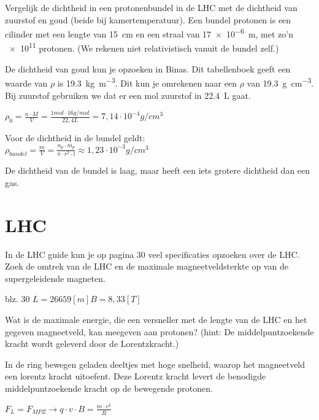 \begin{questions}
\question
Vergelijk de dichtheid in een protonenbundel in de LHC met de dichtheid van zuurstof en goud
(beide bij kamertemperatuur). Een bundel protonen is een cilinder met een lengte
van \SI{15}{\centi\meter} en een straal van \SI{17e-6}{m}, met zo'n \SI{e11}{} protonen.
(We rekenen niet relativistisch vanuit de bundel zelf.)

\begin{solution}

De dichtheid van goud kun je opzoeken in Binas. Dit tabellenboek geeft een waarde van
$\rho$ is \SI{19.3}{\kilogram\per\cubic\meter}. Dit kun je omrekenen naar
een $\rho$ van \SI{19.3}{\gram\per\cubic\centi\meter}.
Bij zuurstof gebruiken we dat er een mol zuurstof in \SI{22.4}{\liter} gaat.

$\rho_0 = \frac{n \cdot M}{V} = \frac {1 mol \cdot 16 g/mol}{22,4 L} = 7,14 \cdot 10^{-4} g/cm^{3} $

Voor de dichtheid in de bundel geldt:\\
$\rho_{bundel} = \frac{m}{V} = \frac{n_{p} \cdot m_{p}}{\pi \cdot r^2 \cdot l} \approx 1,23 \cdot 10^{-3} g/cm^{3}$

De dichtheid van de bundel is laag, maar heeft een iets grotere dichtheid dan een
gas.
\end{solution}

\section{LHC}

In de LHC guide kun je op pagina 30 veel specificaties opzoeken over de LHC.
\question
Zoek de omtrek van de LHC en de maximale magneetveldsterkte op van de
supergeleidende magneten.
\begin{solution}
blz. 30 $L = 26 659 [m] B = 8,33 [T]$
\end{solution}

\question
Wat is de maximale energie, die een versneller met de lengte van de LHC en
het gegeven magneetveld, kan meegeven aan protonen? (hint: De middelpuntzoekende kracht wordt geleverd door
de Lorentzkracht.)

\begin{solution}
In de ring bewegen geladen deeltjes met hoge snelheid, waarop het magneetveld
een lorentz kracht uitoefent. Deze Lorentz kracht levert de benodigde middelpuntzoekende
kracht op de bewegende protonen.

$F_L = F_{MPZ} \rightarrow q \cdot v \cdot B = \frac{m \cdot v^2}{R}$


\end{solution}
\end{questions}
